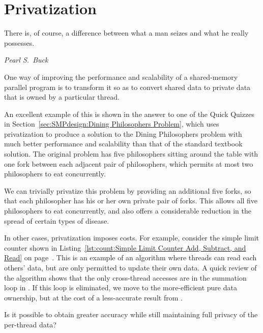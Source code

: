 \section{Privatization}
\label{sec:owned:Privatization}
%
\epigraph{There is, of course, a difference between what a man seizes
	  and what he really possesses.}
	 {\emph{Pearl S.~Buck}}

One way of improving the performance and scalability of a shared-memory
parallel program is to transform it so as to convert shared data to
private data that is owned by a particular thread.

An excellent example of this is shown in the answer to one of the
Quick Quizzes in
Section~\ref{sec:SMPdesign:Dining Philosophers Problem},
which uses privatization to produce a solution to the
Dining Philosophers problem with much better performance and scalability
than that of the standard textbook solution.
The original problem has five philosophers sitting around the table
with one fork between each adjacent pair of philosophers, which permits
at most two philosophers to eat concurrently.

We can trivially privatize this problem by providing an additional five
forks, so that each philosopher has his or her own private pair of forks.
This allows all five philosophers to eat concurrently, and also offers
a considerable reduction in the spread of certain types of disease.

In other cases, privatization imposes costs.
For example, consider the simple limit counter shown in
Listing~\ref{lst:count:Simple Limit Counter Add, Subtract, and Read} on
page~\pageref{lst:count:Simple Limit Counter Add, Subtract, and Read}.
This is an example of an algorithm where threads can read each others'
data, but are only permitted to update their own data.
A quick review of the algorithm shows that the only cross-thread
accesses are in the summation loop in .
If this loop is eliminated, we move to the more-efficient pure
data ownership, but at the cost of a less-accurate result
from .

\QuickQuiz{}
	Is it possible to obtain greater accuracy while still
	maintaining full privacy of the per-thread data?
 \QuickQuizEnd

